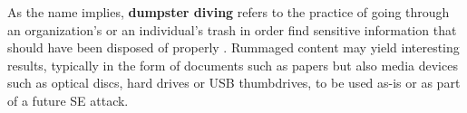 
















As the name implies, \textbf{dumpster diving} refers to the practice of going through an organization's or an individual's trash in order find sensitive information that should have been disposed of properly \citep{syafitri_social_2022}. Rummaged content may yield interesting results, typically in the form of documents such as papers but also media devices such as optical discs, hard drives or USB thumbdrives, to be used as-is or as part of a future SE attack.


